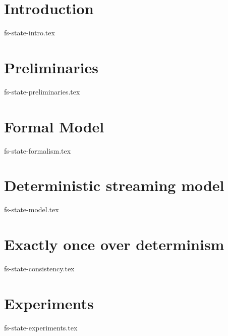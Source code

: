 \documentclass{vldb}
\theoremstyle{definition}
\begin{document}
\section {Introduction}
 {fs-state-intro.tex}

\section {Preliminaries}
 {fs-state-preliminaries.tex}

\section {Formal Model}
 {fs-state-formalism.tex}

\section {Deterministic streaming model}
 {fs-state-model.tex}

\section{Exactly once over determinism}
 {fs-state-consistency.tex}

\section {Experiments}
 {fs-state-experiments.tex}

\section {Related work}
 {fs-state-related.tex}

\section {Conclusion}
 {fs-state-conclusion.tex}

\balance

%   


\end{document}
